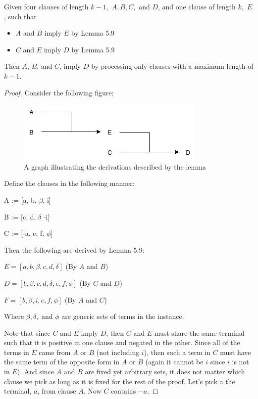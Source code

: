 \documentclass[manuscript]{acmart}
\begin{document}
    \begin{lemma}
        Given four clauses of length $k - 1,$ $A, B, C,$ and $D$, and one clause of 
        length $k,$ $E$, such that 
        \begin{itemize}
            \item $A$ and $B$ imply $E$ by Lemma 5.9
            \item $C$ and $E$ imply $D$ by Lemma 5.9
        \end{itemize}
        Then $A$, $B$, and $C$, imply $D$ by processing only clauses with a maximum length of $k - 1$.
    \end{lemma}
    \begin{proof}
        
        Consider the following figure:
        
        \begin{figure}[h]
            \includegraphics[scale=0.8]{511a}        
            \caption{A graph illustrating the derivations described by the lemma}
            \label{fig:one}
        \end{figure}

        Define the clauses in the following manner:

        A := [a, b, $\beta$, i]

        B := [c, d, $\delta$ -i]

        C := [-a, e, f, $\phi$]

        Then the following are derived by Lemma 5.9:
        
        $E = [a, b, \beta, c, d, \delta]$ (By $A$ and $B$)

        $D = [b, \beta, c, d, \delta, e, f, \phi]$ (By $C$ and $D$)

        $F = [b, \beta, i, e, f, \phi]$ (By $A$ and $C$)

        Where $\beta, \delta, $ and $\phi$ are generic sets of terms in the instance.

        Note that since $C$ and $E$ imply $D$, then $C$ and $E$ must share the
        same terminal such that it is positive in one clause and negated in the other.
        Since all of the terms in $E$ came from $A$ or $B$ (not including $i$),
        then such a term in $C$ must have the same term of the opposite form in
        $A$ or $B$ (again it cannot be $i$ since $i$ is not in $E$). And since
        $A$ and $B$ are fixed yet arbitrary sets, it does not matter which clause
        we pick as long as it is fixed for the rest of the proof. Let's pick a
        the terminal, $a$, from clause $A$. Now $C$ contains $-a$.
 

\end{proof}
\end{document}
